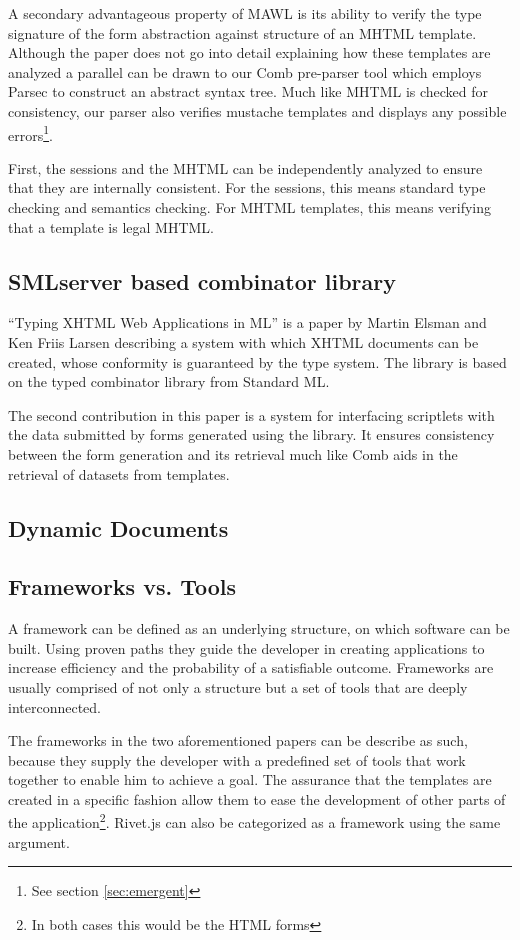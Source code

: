\documentclass[thesis.tex]{subfiles}
\begin{document}
A secondary advantageous property of MAWL is its ability to verify the
type signature of the form abstraction against structure of an MHTML template.
Although the paper does not go into detail explaining how these templates are
analyzed a parallel can be drawn to our Comb pre-parser tool which employs
Parsec to construct an abstract syntax tree. Much like MHTML is checked for
consistency, our parser also verifies mustache templates and displays any
possible errors\footnote{See section \ref{sec:emergent}}.
\begin{citequote}{\cite{MAWL}}
First, the sessions and the MHTML can be independently analyzed to ensure that
they are internally consistent.
For the sessions, this means standard type checking and semantics checking.
For MHTML templates, this means verifying that a template is legal MHTML.
\end{citequote}

\subsection{SMLserver based combinator library}
``Typing XHTML Web Applications in ML''\cite{ML} is a paper by Martin Elsman and
Ken Friis Larsen describing a system with which XHTML documents can be created,
whose conformity is guaranteed by the type system. The library is based on the
typed combinator library from Standard ML.

The second contribution in this paper is a system for interfacing scriptlets
with the data submitted by forms generated using the library.
It ensures consistency between the form generation and its retrieval much like
Comb aids in the retrieval of datasets from templates.

\subsection{Dynamic Documents}

\subsection{Frameworks vs. Tools}
A framework can be defined as an underlying structure, on which software can be
built. Using proven paths they guide the developer in creating applications to
increase efficiency and the probability of a satisfiable outcome.
Frameworks are usually comprised of not only a structure but a set of tools that
are deeply interconnected.

The frameworks in the two aforementioned papers can be describe as such, because
they supply the developer with a predefined set of tools that work together to
enable him to achieve a goal. The assurance that the templates are created in a
specific fashion allow them to ease the development of other parts of the
application\footnote{In both cases this would be the HTML forms}. Rivet.js can
also be categorized as a framework using the same argument.
\end{document}
